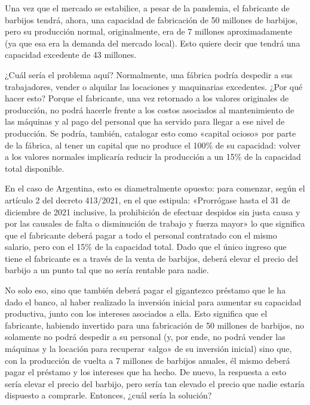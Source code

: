 \documentclass[12pt,a4paper,twoside]{book}
\begin{document}
Una vez que el mercado se estabilice, a pesar de la pandemia, el fabricante de barbijos tendrá, ahora, una capacidad de fabricación de 50 millones de barbijos, pero su producción normal, originalmente, era de 7 millones aproximadamente (ya que esa era la demanda del mercado local). Esto quiere decir que tendrá una capacidad excedente de 43 millones.

¿Cuál sería el problema aquí? Normalmente, una fábrica podría despedir a sus trabajadores, vender o alquilar las locaciones y maquinarias excedentes. ¿Por qué hacer esto? Porque el fabricante, una vez retornado a los valores originales de producción, no podrá hacerle frente a los costos asociados al mantenimiento de las máquinas y al pago del personal que ha servido para llegar a ese nivel de producción. Se podría, también, catalogar esto como «capital ocioso» por parte de la fábrica, al tener un capital que no produce el 100\% de su capacidad: volver a los valores normales implicaría reducir la producción a un 15\% de la capacidad total disponible. 

En el caso de Argentina, esto es diametralmente opuesto: para comenzar, según el artículo 2 del decreto 413/2021, en el que estipula: «Prorrógase hasta el 31 de diciembre de 2021 inclusive, la prohibición de efectuar despidos sin justa causa y por las causales de falta o disminución de trabajo y fuerza mayor» \cite{decreto:antidespidos} lo que significa que el fabricante deberá pagar a todo el personal contratado con el mismo salario, pero con el 15\% de la capacidad total. Dado que el único ingreso que tiene el fabricante es a través de la venta de barbijos, deberá elevar el precio del barbijo a un punto tal que no sería rentable para nadie.

No solo eso, sino que también deberá pagar el gigantezco préstamo que le ha dado el banco, al haber realizado la inversión inicial para aumentar su capacidad productiva, junto con los intereses asociados a ella. Esto significa que el fabricante, habiendo invertido para una fabricación de 50 millones de barbijos, no solamente no podrá despedir a su personal (y, por ende, no podrá vender las máquinas y la locación para recuperar «algo» de su inversión inicial) sino que, con la producción de vuelta a 7 millones de barbijos anuales, él mismo deberá pagar el préstamo y los intereses que ha hecho. De nuevo, la respuesta a esto sería elevar el precio del barbijo, pero sería tan elevado el precio que nadie estaría dispuesto a comprarle. Entonces, ¿cuál sería la solución?
\end{document}
